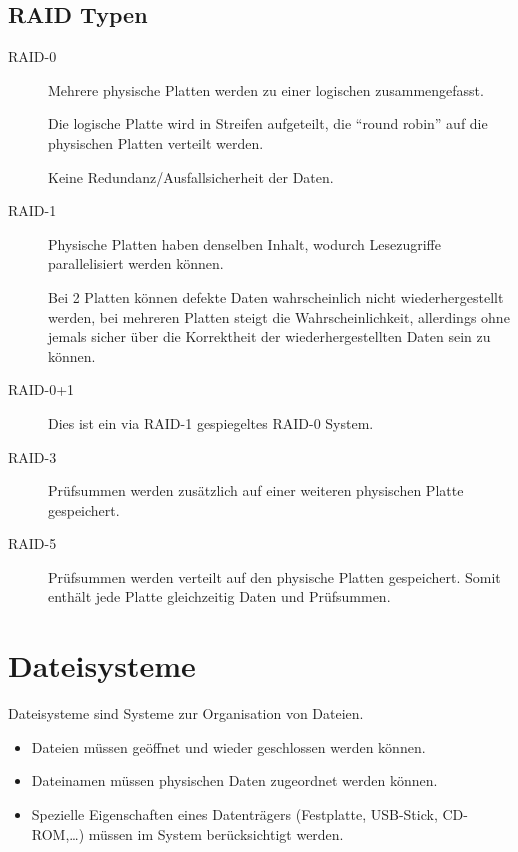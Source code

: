 \subsection{RAID Typen}
\begin{description}
  \item [{RAID-0}]
	Mehrere physische Platten werden zu einer logischen zusammengefasst.

	Die logische Platte wird in Streifen aufgeteilt, die \enquote{round robin} auf die physischen Platten verteilt werden.

	Keine Redundanz/Ausfallsicherheit der Daten.

  \item [{RAID-1}]
	Physische Platten haben denselben Inhalt, wodurch Lesezugriffe parallelisiert werden können.

	Bei 2 Platten können defekte Daten wahrscheinlich nicht wiederhergestellt werden, bei mehreren Platten steigt die Wahrscheinlichkeit, allerdings ohne jemals sicher über die Korrektheit der wiederhergestellten Daten sein zu können.

  \item [{RAID-0+1}]
	Dies ist ein via RAID-1 gespiegeltes RAID-0 System.
  \item [{RAID-3}]
	Prüfsummen werden zusätzlich auf einer weiteren physischen Platte gespeichert.
  \item [{RAID-5}]
	Prüfsummen werden verteilt auf den physische Platten gespeichert.
	Somit enthält jede Platte gleichzeitig Daten und Prüfsummen.
\end{description}

\section{\label{sec:Dateisysteme}Dateisysteme}

Dateisysteme sind Systeme zur Organisation von Dateien.
\begin{itemize}
  \item Dateien müssen geöffnet und wieder geschlossen werden können.
  \item Dateinamen müssen physischen Daten zugeordnet werden können.
  \item Spezielle Eigenschaften eines Datenträgers (Festplatte, USB-Stick, CD-ROM,\ldots{}) müssen im System berücksichtigt werden.
\end{itemize}

